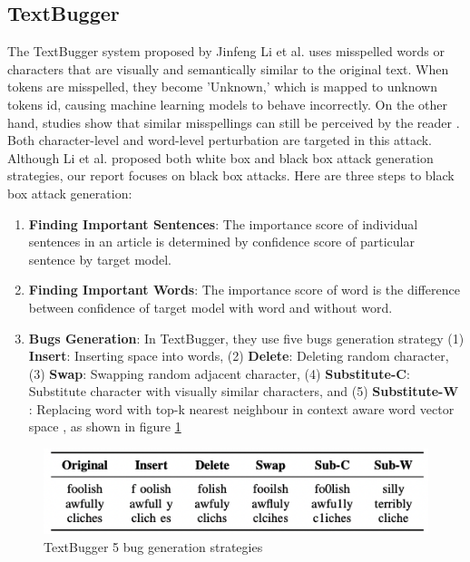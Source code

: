 \documentclass[%
	BCOR=8mm, %
	DIV=12,
	toc=bibliography, %
	toc=listof, %
	oneside, %
	egregdoesnotlikesansseriftitles, %
	]{scrbook}
\begin{document}
\subsection{TextBugger}
\label{subsection:textbugger}
The TextBugger system proposed by Jinfeng Li et al.  \cite{li_textbugger_2019} uses misspelled words or characters that are visually and semantically similar to the original text. When tokens are misspelled, they become 'Unknown,' which is mapped to unknown tokens id, causing machine learning models to behave incorrectly. On the other hand, studies show that similar misspellings can still be perceived by the reader \cite{rawlinson_significance_2007,alzantot_generating_2018}. Both character-level and word-level perturbation are targeted in this attack. Although Li et al. \cite{li_textbugger_2019}  proposed both white box and black box attack generation strategies, our report focuses on black box attacks. Here are three steps to black box attack generation:
\begin{enumerate}
    \item \textbf{Finding Important Sentences}: The importance score of individual sentences in an article is determined by confidence score of particular sentence by target model.
    \item \textbf{Finding Important Words}: The importance score of word is the difference between confidence of target model with word and without word.
    \item \textbf{Bugs Generation}: In TextBugger, they use five bugs generation strategy (1) \textbf{Insert}: Inserting space into words, (2) \textbf{Delete}: Deleting random character,
    (3) \textbf{Swap}: Swapping random adjacent character, (4) \textbf{Substitute-C}: Substitute character with visually similar characters, and (5)\textbf{ Substitute-W} : Replacing word with top-k nearest neighbour in context aware word vector space , as shown in figure \ref{diag:textbug}
\end{enumerate}

\begin{figure}[H]
    \centering
    \includegraphics[width=.7\textwidth]{img/textbugger_5strat.png}
    \caption[Example of 5 bug generation strategies of TextBugger]{TextBugger 5 bug generation strategies \cite{li_textbugger_2019} }
    \label{diag:textbug}
\end{figure}
\end{document}
